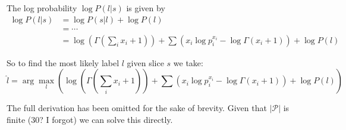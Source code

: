 \documentclass[12pt,a4paper,twoside,openright]{report}
\theoremstyle{definition}
\begin{document}
The log probability $\log P(l|s)$ is given by 
\begin{equation}
  \begin{align}
    \log P(l|s) &= \log P(s|l) + \log P(l) \\      
                &= \cdots \\
                &= \log \left(\Gamma\left(\sum\limits_{i} x_i + 1\right) \right) 
                +  \sum\limits \left( x_i \log p_i^{x_i} - \log \Gamma (x_i + 1) \right) 
                +  \log P(l)
  \end{align}
  \label{eq:loglabelgivenchordtones}
\end{equation}

So to find the most likely label $l$ given slice $s$ we take:
\begin{equation}
  \hat{l} = \arg\max_l \left(\log \left(\Gamma\left(\sum\limits_{i} x_i + 1\right) \right) 
                +  \sum\limits \left( x_i \log p_i^{x_i} - \log \Gamma (x_i + 1) \right) 
                +  \log P(l) \right)
  \label{eq:loglabsol}
\end{equation}


The full derivation has been omitted for the sake of brevity. Given that $|\mathcal{P}|$ is finite ($30$? I forgot) we can solve this directly. 

\end{document}
